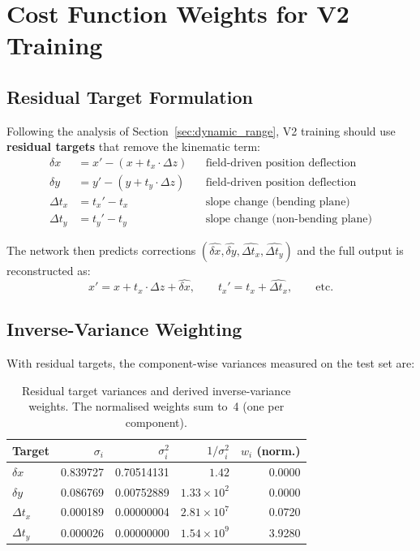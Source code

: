 \documentclass[11pt,a4paper]{article}
\newcommand{\dz}{\Delta z}
\newcommand{\tx}{t_x}
\newcommand{\ty}{t_y}
\begin{document}
\section{Cost Function Weights for V2 Training}
\label{sec:weights}

\subsection{Residual Target Formulation}
\label{sec:residual}

Following the analysis of Section~\ref{sec:dynamic_range}, V2 training should use \textbf{residual targets} that remove the kinematic term:
\begin{align}
  \delta x &= x' - (x + \tx \cdot \dz) && \text{field-driven position deflection} \\
  \delta y &= y' - (y + \ty \cdot \dz) && \text{field-driven position deflection} \\
  \Delta\tx &= \tx' - \tx && \text{slope change (bending plane)} \\
  \Delta\ty &= \ty' - \ty && \text{slope change (non-bending plane)}
\end{align}

The network then predicts corrections $(\hat{\delta x}, \hat{\delta y}, \widehat{\Delta\tx}, \widehat{\Delta\ty})$ and the full output is reconstructed as:
\begin{equation}
  x' = x + \tx \cdot \dz + \hat{\delta x}, \qquad \tx' = \tx + \widehat{\Delta\tx}, \qquad \text{etc.}
\end{equation}

\subsection{Inverse-Variance Weighting}
\label{sec:inv_var}

With residual targets, the component-wise variances measured on the test set are:

\begin{table}[H]
\centering
\caption{Residual target variances and derived inverse-variance weights. The normalised weights sum to~4 (one per component).}
\label{tab:weights}
\begin{tabular}{@{}l r r r r@{}}
\toprule
Target            & $\sigma_i$  & $\sigma_i^2$      & $1/\sigma_i^2$ & $w_i$ (norm.) \\
\midrule
$\delta x$       & 0.839727  & 0.70514131  & $1.42$                   & 0.0000 \\
$\delta y$       & 0.086769  & 0.00752889  & $1.33 \times 10^{2}$     & 0.0000 \\
$\Delta\tx$      & 0.000189  & 0.00000004  & $2.81 \times 10^{7}$     & 0.0720 \\
$\Delta\ty$      & 0.000026  & 0.00000000  & $1.54 \times 10^{9}$     & 3.9280 \\
\bottomrule
\end{tabular}
\end{table}
\end{document}
